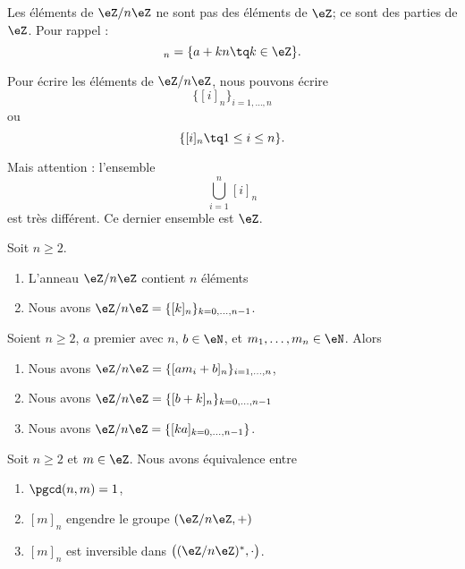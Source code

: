 \begin{normaltext}
	Les éléments de \( \eZ/n\eZ\) ne sont pas des éléments de \( \eZ\); ce sont des parties de \( \eZ\). Pour rappel :
	\begin{equation}
		[a]_n=\{ a+kn \tq k\in \eZ \}.
	\end{equation}

	Pour écrire les éléments de \( \eZ/n\eZ\), nous pouvons écrire
	\begin{equation}
		\{ [i]_n \}_{i=1,\ldots, n}
	\end{equation}
	ou
	\begin{equation}
		\{ [i]_n\tq 1\leq i\leq n \}.
	\end{equation}

	Mais attention : l'ensemble
	\begin{equation}
		\bigcup_{i=1}^n[i]_n
	\end{equation}
	est très différent. Ce dernier ensemble est \( \eZ\).
\end{normaltext}

\begin{proposition}   \label{PROPooEWREooUOSMsE}
	Soit \( n\geq 2\).
	\begin{enumerate}
		\item
		      L'anneau \( \eZ/n\eZ\) contient \( n\) éléments
		\item
		      Nous avons \( \eZ/n\eZ=\{ [k]_n \}_{k=0,\ldots, n-1}\).
	\end{enumerate}
\end{proposition}

\begin{proposition}       \label{PROPooSKSYooZoDhIP}
	Soient \( n\geq 2\), \( a\) premier avec \( n\), \( b\in \eN\), et \( m_1,\ldots, m_n\in \eN\). Alors
	\begin{enumerate}
		\item
		      Nous avons \( \eZ/n\eZ=\{ [am_i+b]_n \}_{i=1,\ldots, n}\),
		\item
		      Nous avons \( \eZ/n\eZ=\{ [b+k]_n \}_{k=0,\ldots, n-1}\)
		\item
		      Nous avons \( \eZ/n\eZ=\{ [ka]_{k=0,\ldots, n-1} \}\).
	\end{enumerate}
\end{proposition}

\begin{proposition}       \label{PROPooMTWGooEMbvDi}
	Soit \( n\geq 2\) et \( m\in \eZ\). Nous avons équivalence entre
	\begin{enumerate}
		\item
		      \( \pgcd(n,m)=1\),
		\item
		      \( [m]_n\) engendre le groupe \( (\eZ/n\eZ,+)\)
		\item
		      \( [m]_n\) est inversible dans \( \big( (\eZ/n\eZ)^*,\cdot \big)\).
	\end{enumerate}
\end{proposition}

